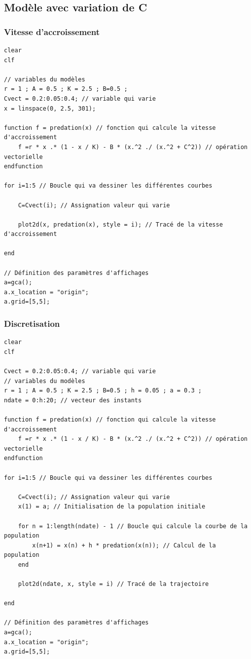 \documentclass{article}
\begin{document}
\subsection{Modèle avec variation de C}

\subsubsection{Vitesse d'accroissement}

\begin{verbatim}
clear
clf

// variables du modèles
r = 1 ; A = 0.5 ; K = 2.5 ; B=0.5 ;
Cvect = 0.2:0.05:0.4; // variable qui varie
x = linspace(0, 2.5, 301);

function f = predation(x) // fonction qui calcule la vitesse d'accroissement
    f =r * x .* (1 - x / K) - B * (x.^2 ./ (x.^2 + C^2)) // opération vectorielle
endfunction

for i=1:5 // Boucle qui va dessiner les différentes courbes
 
    C=Cvect(i); // Assignation valeur qui varie

    plot2d(x, predation(x), style = i); // Tracé de la vitesse d'accroissement

end

// Définition des paramètres d'affichages
a=gca();
a.x_location = "origin";
a.grid=[5,5];
\end{verbatim}

\subsubsection{Discretisation}

\begin{verbatim}
clear
clf

Cvect = 0.2:0.05:0.4; // variable qui varie
// variables du modèles
r = 1 ; A = 0.5 ; K = 2.5 ; B=0.5 ; h = 0.05 ; a = 0.3 ;
ndate = 0:h:20; // vecteur des instants

function f = predation(x) // fonction qui calcule la vitesse d'accroissement
    f =r * x .* (1 - x / K) - B * (x.^2 ./ (x.^2 + C^2)) // opération vectorielle
endfunction

for i=1:5 // Boucle qui va dessiner les différentes courbes
    
    C=Cvect(i); // Assignation valeur qui varie
    x(1) = a; // Initialisation de la population initiale
    
    for n = 1:length(ndate) - 1 // Boucle qui calcule la courbe de la population
        x(n+1) = x(n) + h * predation(x(n)); // Calcul de la population
    end
    
    plot2d(ndate, x, style = i) // Tracé de la trajectoire

end

// Définition des paramètres d'affichages
a=gca();
a.x_location = "origin";
a.grid=[5,5];
\end{verbatim}
\end{document}
